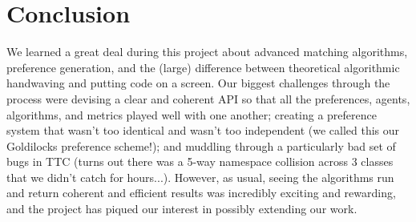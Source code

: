 \documentclass[12pt]{article}
\begin{document}
\section*{Conclusion}
We learned a great deal during this project about advanced matching algorithms, preference generation, and the (large) difference between theoretical algorithmic handwaving and putting code on a screen. Our biggest challenges through the process were devising a clear and coherent API so that all the preferences, agents, algorithms, and metrics played well with one another; creating a preference system that wasn't too identical and wasn't too independent (we called this our Goldilocks preference scheme!); and muddling through a particularly bad set of bugs in TTC (turns out there was a 5-way namespace collision across 3 classes that we didn't catch for hours...). However, as usual, seeing the algorithms run and return coherent and efficient results was incredibly exciting and rewarding, and the project has piqued our interest in possibly extending our work.
 
\end{document}
